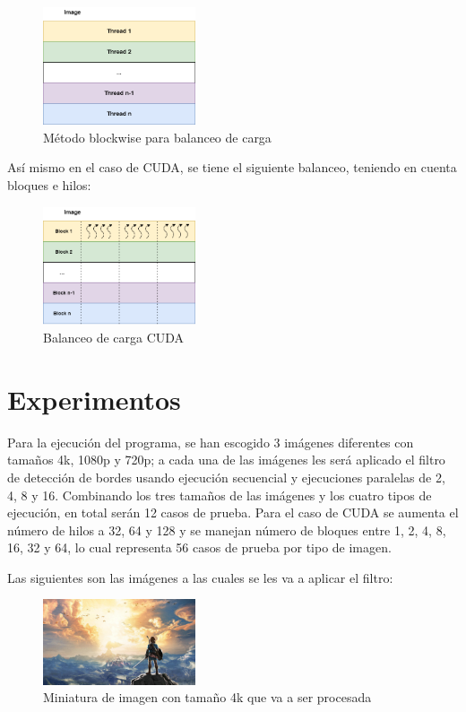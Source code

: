 \begin{itemize}
\begin{figure}[H]
        \includegraphics[width=0.4\textwidth]{../plots/load_balancing.drawio.png}
        \caption{Método blockwise para balanceo de carga}
    \end{figure}
    Así mismo en el caso de CUDA, se tiene el siguiente balanceo, teniendo en cuenta bloques e hilos:
    \begin{figure}[H]
        \centering
        \includegraphics[width=0.4\textwidth]{../plots/load_balancing_cuda.drawio.png}
        \caption{Balanceo de carga CUDA}
    \end{figure}
\end{itemize}

\section{Experimentos}

Para la ejecución del programa, se han escogido 3 imágenes diferentes con tamaños 4k, 1080p y 720p; a cada una de las imágenes les será aplicado el filtro de detección de bordes usando ejecución secuencial y ejecuciones paralelas de 2, 4, 8 y 16. Combinando los tres tamaños de las imágenes y los cuatro tipos de ejecución, en total serán 12 casos de prueba. Para el caso de CUDA se aumenta el número de hilos a 32, 64 y 128 y se manejan número de bloques entre 1, 2, 4, 8, 16, 32 y 64, lo cual representa 56 casos de prueba por tipo de imagen.

Las siguientes son las imágenes a las cuales se les va a aplicar el filtro:

\begin{figure}[H]
    \centering
    \includegraphics[width=0.4\textwidth]{../plots/4k.jpg}
    \caption{Miniatura de imagen con tamaño 4k que va a ser procesada}
\end{figure}

